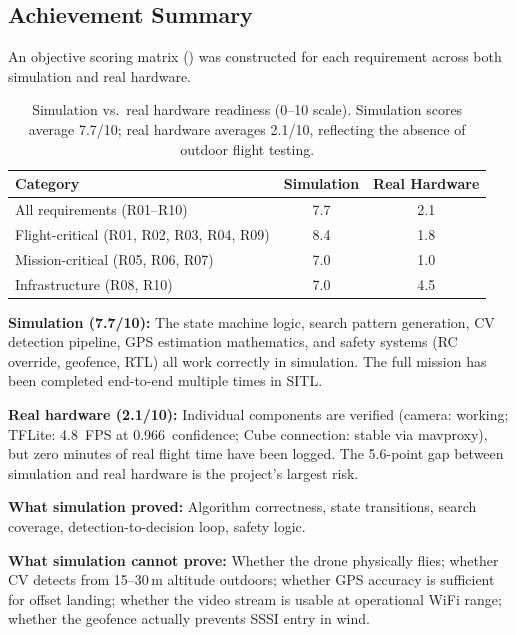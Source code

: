 \subsection{Achievement Summary}\label{sec:achievement-summary}

An objective scoring matrix () was constructed
for each requirement across both simulation and real hardware.

\begin{table}[H]
\centering
\compactTable
\caption{Simulation vs.\ real hardware readiness (0--10 scale).  Simulation scores average 7.7/10; real hardware averages 2.1/10, reflecting the absence of outdoor flight testing.}
\label{tab:sim-vs-real}
\begin{tabular}{@{}l c c@{}}
\toprule
\textbf{Category} & \textbf{Simulation} & \textbf{Real Hardware} \\
\midrule
All requirements (R01--R10) & 7.7 & 2.1 \\
Flight-critical (R01, R02, R03, R04, R09) & 8.4 & 1.8 \\
Mission-critical (R05, R06, R07) & 7.0 & 1.0 \\
Infrastructure (R08, R10) & 7.0 & 4.5 \\
\bottomrule
\end{tabular}
\end{table}

\textbf{Simulation (7.7/10):}  The state machine logic, search pattern
generation, CV detection pipeline, GPS estimation mathematics, and
safety systems (RC override, geofence, RTL) all work correctly in
simulation.  The full mission has been completed end-to-end multiple
times in SITL.

\textbf{Real hardware (2.1/10):}  Individual components are verified
(camera: working; TFLite: 4.8~FPS at 0.966~confidence; Cube
connection: stable via mavproxy), but zero minutes of real flight
time have been logged.  The 5.6-point gap between simulation and
real hardware is the project's largest risk.

\textbf{What simulation proved:}  Algorithm correctness, state
transitions, search coverage, detection-to-decision loop, safety
logic.

\textbf{What simulation cannot prove:}  Whether the drone physically
flies; whether CV detects from 15--30\,m altitude outdoors; whether
GPS accuracy is sufficient for offset landing; whether the video
stream is usable at operational WiFi range; whether the geofence
actually prevents SSSI entry in wind.

